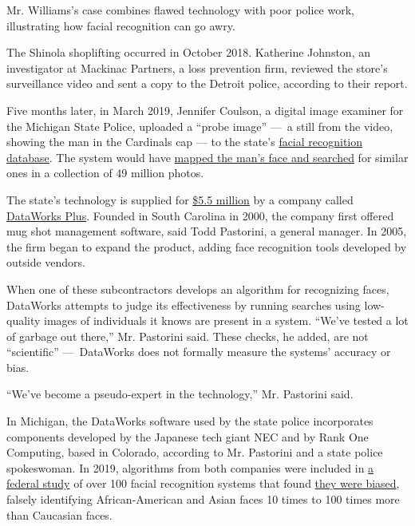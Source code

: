 Mr. Williams's case combines flawed technology with poor police work,
illustrating how facial recognition can go awry.

The Shinola shoplifting occurred in October 2018. Katherine Johnston, an
investigator at Mackinac Partners, a loss prevention firm, reviewed the
store's surveillance video and sent a copy to the Detroit police,
according to their report.

Five months later, in March 2019, Jennifer Coulson, a digital image
examiner for the Michigan State Police, uploaded a ``probe image'' ---~a
still from the video, showing the man in the Cardinals cap --- to the
state's
\href{https://www.michigan.gov/msp/0,4643,7-123-72297_64747_64749-357133--,00.html\#:~:text=The\%20Statewide\%20Network\%20of\%20Agency,data\%20for\%20law\%20enforcement\%20access.}{facial
recognition database}. The system would have
\href{https://www.michigan.gov/documents/msp/Facial_Recognition_FAQ_666807_7.pdf}{mapped
the man's face and searched} for similar ones in a collection of 49
million photos.

The state's technology is supplied for
\href{https://www.michigan.gov/documents/buymichiganfirst/0200097_307265_7.pdf}{\$5.5
million} by a company called
\href{http://www.dataworksplus.com/}{DataWorks Plus}. Founded in South
Carolina in 2000, the company first offered mug shot management
software, said Todd Pastorini, a general manager. In 2005, the firm
began to expand the product, adding face recognition tools developed by
outside vendors.

When one of these subcontractors develops an algorithm for recognizing
faces, DataWorks attempts to judge its effectiveness by running searches
using low-quality images of individuals it knows are present in a
system. ``We've tested a lot of garbage out there,'' Mr. Pastorini said.
These checks, he added, are not ``scientific'' ---~DataWorks does not
formally measure the systems' accuracy or bias.

``We've become a pseudo-expert in the technology,'' Mr. Pastorini said.

In Michigan, the DataWorks software used by the state police
incorporates components developed by the Japanese tech giant NEC and by
Rank One Computing, based in Colorado, according to Mr. Pastorini and a
state police spokeswoman. In 2019, algorithms from both companies were
included in
\href{https://nvlpubs.nist.gov/nistpubs/ir/2019/NIST.IR.8280.pdf}{a
federal study} of over 100 facial recognition systems that found
\href{https://www.nytimes3xbfgragh.onion/2019/12/19/technology/facial-recognition-bias.html}{they
were biased}, falsely identifying African-American and Asian faces 10
times to 100 times more than Caucasian faces.

